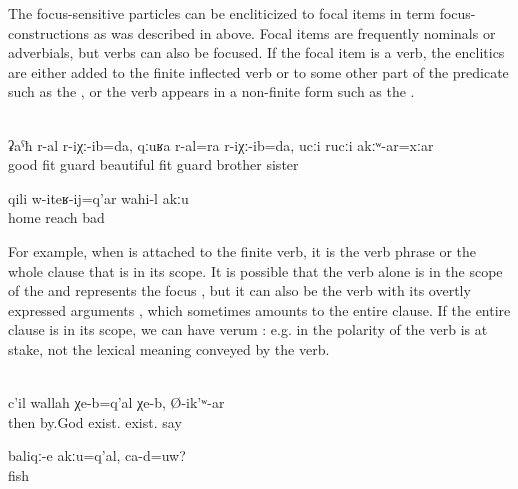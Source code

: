 The focus-sensitive particles can be encliticized to focal items in term focus-constructions as was described in  above. Focal items are frequently nominals or adverbials, but verbs can also be focused. If the focal item is a verb, the enclitics are either added to the finite inflected verb or to some other part of the predicate such as the  , or the verb appears in a non-finite form such as the  .
%
\begin{exe}
	\\\label{ex:He guarded me well, he also guarded me safely, although without brothers and sisters}%
	\gll	ʡaˁħ	r-al	r-iχː-ib=da,	qːuʁa	r-al=ra	r-iχː-ib=da, ucːi	rucːi	akːʷ-ar=xːar\\
		good	\tsc{f-}fit	guard	beautiful	\tsc{f-}fit	guard brother	sister	\\
	\glt	{}

	\ex	\label{ex:‎Coming home is not bad}
	\gll	qili	w-iteʁ-ij=q'ar	wahi-l	akːu\\
		home	reach	bad	\\
	\glt	{}
\end{exe}

For example, when  is attached to the finite verb, it is the verb phrase or the whole clause that is in its scope. It is possible that the verb alone is in the scope of the  and represents the focus , but it can also be the verb with its overtly expressed arguments , which sometimes amounts to the entire clause. If the entire clause is in its scope, we can have verum : e.g. in  the polarity of the verb is at stake, not the lexical meaning conveyed by the verb.
%
\begin{exe}
	\\\label{ex:Well, by God, we do have them, he said@17c}%
	\gll	c'il	wallah	χe-b=q'al	χe-b,	Ø-ik'ʷ-ar\\
		then	by.God	exist.	exist.	say\\
	\glt	{}

	\ex	\label{ex:These are NOT fish, right@8e}
	\gll	baliqː-e	akːu=q'al,	ca-d=uw?\\
		fish		\\
	\glt	{}
\end{exe}

